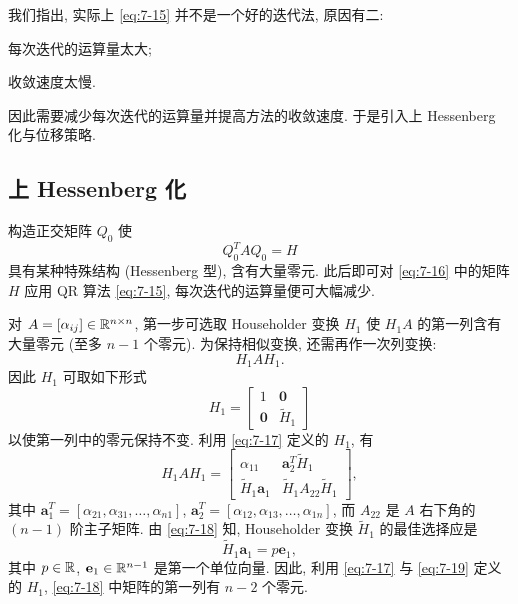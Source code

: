 我们指出, 实际上 \eqref{eq:7-15} 并不是一个好的迭代法, 原因有二:
\begin{romanlist}
  \item 每次迭代的运算量太大;
  \item 收敛速度太慢.
\end{romanlist}
因此需要减少每次迭代的运算量并提高方法的收敛速度. 于是引入上 Hessenberg 化与位移策略.

\subsection{上 Hessenberg 化}
\label{sec:7-5-1}

构造正交矩阵 $Q_0$ 使
\begin{equation}
  Q_0^TAQ_0=H
  \label{eq:7-16}
\end{equation}
具有某种特殊结构 (Hessenberg 型), 含有大量零元. 此后即可对 \eqref{eq:7-16} 中的矩阵 $H$ 应用 QR 算法 \eqref{eq:7-15}, 每次迭代的运算量便可大幅减少.

对 $A=[\alpha_{ij}]\in\mathbb{R}^{n\times n}$, 第一步可选取 Householder 变换 $H_1$ 使 $H_1A$ 的第一列含有大量零元 (至多 $n-1$ 个零元). 为保持相似变换, 还需再作一次列变换:
\[
  H_1AH_1.
\]
因此 $H_1$ 可取如下形式
\begin{equation}
  H_1=\begin{bmatrix}
    1 & \mathbf{0}\\
    \mathbf{0} & \widetilde{H}_1
  \end{bmatrix}
  \label{eq:7-17}
\end{equation}
以使第一列中的零元保持不变. 利用 \eqref{eq:7-17} 定义的 $H_1$, 有
\begin{equation}
  H_1AH_1=\begin{bmatrix}
    \alpha_{11} & \mathbf{a}_2^T\widetilde{H}_1\\
    \widetilde{H}_1\mathbf{a}_1 & \widetilde{H}_1A_{22}\widetilde{H}_1
  \end{bmatrix},
  \label{eq:7-18}
\end{equation}
其中 $\mathbf{a}_1^T=[\alpha_{21},\alpha_{31},\ldots,\alpha_{n1}]$, $\mathbf{a}_2^T=[\alpha_{12},\alpha_{13},\ldots,\alpha_{1n}]$, 而 $A_{22}$ 是 $A$ 右下角的 $(n-1)$ 阶主子矩阵. 由 \eqref{eq:7-18} 知, Householder 变换 $\widetilde{H}_1$ 的最佳选择应是
\begin{equation}
  \widetilde{H}_1\mathbf{a}_1=p\mathbf{e}_1,
  \label{eq:7-19}
\end{equation}
其中 $p\in\mathbb{R}$, $\mathbf{e}_1\in\mathbb{R}^{n-1}$ 是第一个单位向量. 因此, 利用 \eqref{eq:7-17} 与 \eqref{eq:7-19} 定义的 $H_1$, \eqref{eq:7-18} 中矩阵的第一列有 $n-2$ 个零元.

